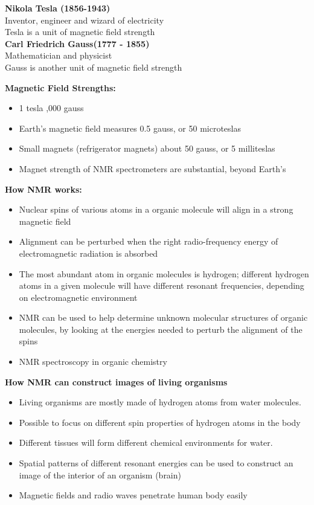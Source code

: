 \documentclass{article}
\begin{document}
\textbf{Nikola Tesla (1856-1943)}\\
Inventor, engineer and wizard of electricity \\ 
Tesla is a unit of magnetic field strength \\

\textbf{Carl Friedrich Gauss(1777 - 1855)} \\
Mathematician and physicist \\ 
Gauss is another unit of magnetic field strength 

\textbf{Magnetic Field Strengths:}
\begin{itemize}
    \item 1 tesla ,000 gauss
    \item Earth's magnetic field measures 0.5 gauss, or 50 microteslas
    \item Small magnets (refrigerator magnets) about 50 gauss, or 5 milliteslas 
    \item Magnet strength of NMR spectrometers are substantial, beyond Earth's 
\end{itemize}

\textbf{How NMR works:}
\begin{itemize}
    \item Nuclear spins of various atoms in a organic molecule will align in a strong magnetic field
    \item Alignment can be perturbed when the right radio-frequency energy of electromagnetic radiation is absorbed
    \item The most abundant atom in organic molecules is hydrogen; different hydrogen atoms in a given molecule will have different resonant frequencies, depending on electromagnetic environment
    \item NMR can be used to help determine unknown molecular structures of organic molecules, by looking at the energies needed to perturb the alignment of the spins 
    \item NMR spectroscopy in organic chemistry
\end{itemize}

\textbf{How NMR can construct images of living organisms}
\begin{itemize}
    \item Living organisms are mostly made of hydrogen atoms from water molecules. 
    \item Possible to focus on different spin properties of hydrogen atoms in the body
    \item Different tissues will form different chemical environments for water. 
    \item Spatial patterns of different resonant energies can be used to construct an image of the interior of an organism (brain) 
    \item Magnetic fields and radio waves penetrate human body easily
\end{itemize}
\end{document}
